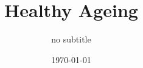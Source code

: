 \documentclass{master_thesis.style}		%
\begin{document}

\title{Healthy Ageing}
\addresses{\groupname\\\deptname\\\univname}
\date{\today}
\subject{Healthy Ageing}
\subtitle {no subtitle}
% 

\maketitle



\tableofcontents


%




%





%
%

\typeout{}




\end{document}

